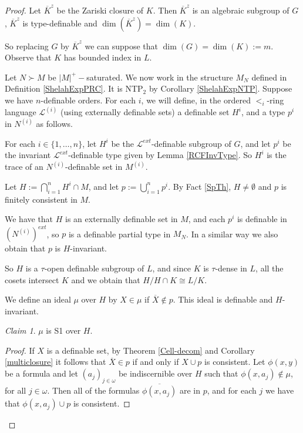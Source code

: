 \documentclass[12pt]{article}
\theoremstyle{definition}
\theoremstyle{mystyle}
\theoremstyle{remark}
\newtheorem*{claim}{Claim}
\newenvironment{claimproof}
    {\begin{proof}}{\renewcommand\qedsymbol{\Squarepipe} \end{proof}}
\newcommand{\clos}[2]{#1^{(#2)}}
\begin{document}
\begin{proof}

Let $\overline{K}^z$ be the Zariski closure of $K$. Then
$\overline{K}^z$ is an algebraic subgroup of $G$,
$\overline{K}^z$ is type-definable and $\dim(\overline{K}^z)=
\dim(K)$.

So replacing $G$ by $\overline{K}^z$ we can suppose that $\dim(G)
= \dim(K) := m$. Observe that $K$ has bounded index in $L$.

Let $N \succ M$ be $|M|^+-$saturated. We now work in the structure
$M_N$ defined in Definition \ref{ShelahExpPRC}. It is NTP$_2$ by
Corollary \ref{ShelahExpNTP}. Suppose we have $n$-definable
orders. For each $i$, we will define, in the ordered $<_i$-ring
language $\clos{\mathcal L}{i}$ (using externally definable sets)
a definable set $H^i$, and a type $p^i$ in $\clos{N}{i}$ as
follows.

For each $i \in \{1, \dots, n\}$, let $H^i$ be the $\mathcal
L^{ext}$-definable subgroup  of $G$, and let $p^i$ be the
invariant $\mathcal L^{ext}$-definable type given by Lemma
\ref{RCFInvType}. So $H^i$ is the trace of an
$\clos{N}{i}$-definable set in $\clos{M}{i}$.

Let $H:= \displaystyle{\bigcap_{i=1}^n} H^ i \cap M$, and let $p
:= \displaystyle{\bigcup_{i = 1}^n p^i}$. By Fact \ref{SpTh}, $H
\not = \emptyset$ and $p$ is finitely consistent in $M$.

We have that $H$ is an externally definable set in $M$, and each
$p^i$ is definable in $(\clos{N}{i})^{ext}$, so $p$ is a definable
partial type in $M_N$. In a similar way we also obtain that $p$ is
$H$-invariant.

So $H$ is a $\tau$-open definable subgroup of $L$, and since $K$
is $\tau$-dense in $L$, all the cosets intersect $K$ and we obtain
that $H/H\cap K\cong L/K$.

We define an ideal $\mu$ over $H$ by $X \in \mu$ if $\overline{X}
\not \in p$. This ideal is definable and $H$-invariant.

 \begin{claim}
$\mu$ is S1 over $H$.
\end{claim}

\begin{claimproof}
If $X$ is a definable set, by Theorem \ref{Cell-decom} and
Corollary \ref{multiclosure} it follows that $\overline{X}\in p$
if and only if $X \cup p$ is consistent. Let $\phi(x,y)$  be a
formula and let $(a_j)_{j \in \omega}$ be indiscernible over $H$
such that $\phi(x, a_j) \not \in \mu$, for all $j\in \omega$. Then
all of the formulas $\overline{\phi(x, a_j)}$ are in $p$, and for
each $j$ we have that $\phi(x,a_j) \cup p$ is consistent.


\end{claimproof}
\end{proof}
\end{document}

